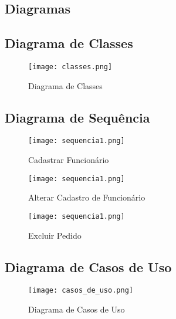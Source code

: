\begin{landscape}
\section{Diagramas}\label{diagramas}

\subsection{Diagrama de Classes}
\begin{figure}[htb]
	\centering
	\texttt{[image: classes.png]}
	\caption{Diagrama de Classes}
\end{figure}



\subsection{Diagrama de Sequência}
\begin{figure}[htb]
	\centering
	\texttt{[image: sequencia1.png]}
	\caption{Cadastrar Funcionário}
\end{figure}

\begin{figure}[htb]
	\centering
	\texttt{[image: sequencia1.png]}
	\caption{Alterar Cadastro de Funcionário}
\end{figure}

\begin{figure}[htb]
	\centering
	\texttt{[image: sequencia1.png]}
	\caption{Excluir Pedido}
\end{figure}

\clearpage

\subsection{Diagrama de Casos de Uso}
\begin{figure}[htb]
	\centering
	\texttt{[image: casos\_de\_uso.png]}
	\caption{Diagrama de Casos de Uso}
\end{figure}
\end{landscape}